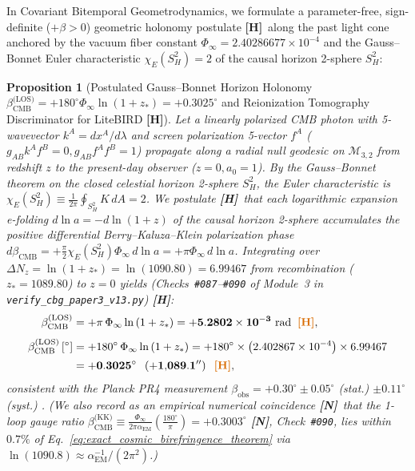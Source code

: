 \documentclass[11pt,a4paper]{article}
\newcommand{\catH}{\textbf{\textcolor{orange!85!black}{[H]}}}
\newcommand{\catN}{\textbf{\textcolor{teal!75!black}{[N]}}}
\theoremstyle{plain}
\newtheorem{proposition}[theorem]{Proposition}
\theoremstyle{definition}
\theoremstyle{remark}
\numberwithin{equation}{section}
\begin{document}
In Covariant Bitemporal Geometrodynamics, we formulate a parameter-free, sign-definite ($+\beta > 0$) geometric holonomy postulate \catH\ along the past light cone anchored by the vacuum fiber constant $\Phi_{\infty} = 2.40286677 \times 10^{-4}$ and the Gauss--Bonnet Euler characteristic $\chi_E(S^2_H) = 2$ of the causal horizon 2-sphere $S^2_H$:

\begin{proposition}[Postulated Gauss--Bonnet Horizon Holonomy $\beta_{\text{CMB}}^{\text{(LOS)}} = +180^\circ\Phi_{\infty}\ln(1+z_*) = +0.3025^\circ$ and Reionization Tomography Discriminator for LiteBIRD \catH]
\label{prop:cosmic_birefringence_los}
Let a linearly polarized CMB photon with 5-wavevector $k^A = dx^A / d\lambda$ and screen polarization 5-vector $f^A$ ($g_{AB}k^A f^B = 0, \allowbreak g_{AB}f^A f^B = 1$) propagate along a radial null geodesic on $\mathcal{M}_{3,2}$ from redshift $z$ to the present-day observer ($z = 0, a_0 = 1$). By the Gauss--Bonnet theorem on the closed celestial horizon 2-sphere $S^2_H$, the Euler characteristic is $\chi_E(S^2_H) \equiv \frac{1}{2\pi}\oint_{S^2_H} K\,dA = 2$. We postulate \catH\ that each logarithmic expansion e-folding $d\ln a = -d\ln(1+z)$ of the causal horizon 2-sphere accumulates the positive differential Berry--Kaluza--Klein polarization phase $d\beta_{\text{CMB}} = +\frac{\pi}{2}\chi_E(S^2_H)\Phi_{\infty}\,d\ln a = +\pi\Phi_{\infty}\,d\ln a$. Integrating over $\Delta N_z = \ln(1 + z_*) = \ln(1090.80) = 6.99467$ from recombination ($z_* = 1089.80$) to $z = 0$ yields (Checks~\texttt{\#087}--\texttt{\#090} of Module~3 in \allowbreak\texttt{verify\_cbg\_paper3\_v13.py}) \catH:
\begin{align}
\beta_{\text{CMB}}^{\text{(LOS)}} &= +\pi\,\Phi_{\infty} \ln\left(1 + z_*\right) = \mathbf{+5.2802 \times 10^{-3}\text{ rad}} \;\;\catH, \nonumber \\[4pt]
\beta_{\text{CMB}}^{\text{(LOS)}}\left[^\circ\right] &= +180^\circ\,\Phi_{\infty}\ln\left(1 + z_*\right) = +180^\circ \times \left(2.402867 \times 10^{-4}\right) \times 6.99467 \nonumber \\[2pt]
&= \mathbf{+0.3025^\circ} \;\; \left(\mathbf{+1{,}089.1''}\right) \;\;\catH,
\label{eq:exact_cosmic_birefringence_theorem}
\end{align}
consistent with the \textit{Planck} PR4 measurement $\beta_{\text{obs}} = +0.30^\circ \pm 0.05^\circ$ (stat.) $\pm 0.11^\circ$ (syst.) \cite{minami2020,diego2022,eskilt2022}. (We also record as an empirical numerical coincidence \catN\ that the 1-loop gauge ratio $\beta_{\text{CMB}}^{\text{(KK)}} \equiv \frac{\Phi_{\infty}}{2\pi\alpha_{\text{EM}}}\left(\frac{180^\circ}{\pi}\right) = \mathbf{+0.3003^\circ}$ \catN, Check~\texttt{\#090}, lies within $0.7\%$ of Eq.~\ref{eq:exact_cosmic_birefringence_theorem} via $\ln(1090.8) \approx \alpha_{\text{EM}}^{-1}/(2\pi^2)$.)
\end{proposition}
\end{document}
